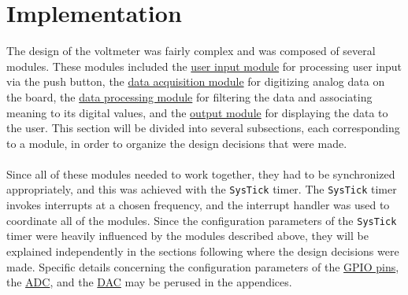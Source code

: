 \documentclass[12pt]{report}
\begin{document}
\section{Implementation}
The design of the voltmeter was fairly complex and was composed of several modules.
These modules included the \hyperref[userinput]{user input module} for processing user input via the
push button, the \hyperref[dataaq]{data
acquisition module} for digitizing analog data on the board, the \hyperref[dataproc]{data processing
module} for filtering
the data and associating meaning to its digital values, and the \hyperref[output]{output module} for
displaying the
data to the user. This section will be divided into several subsections, each corresponding to a
module, in order to organize the design decisions that were made.\\\\
Since all of these modules needed to work together, they had to be synchronized
appropriately, and this was achieved with the \texttt{SysTick} timer. The \texttt{SysTick} timer
invokes interrupts at a chosen frequency, and the interrupt handler was used to coordinate all of
the modules. Since the configuration parameters of the \texttt{SysTick} timer were heavily
influenced by the modules described above, they will be explained independently in the sections
following where the design decisions were made. Specific details concerning the configuration
parameters of the \hyperref[appendixgpio]{GPIO pins}, the \hyperref[appendixadc]{ADC}, and the
\hyperref[appendixdac]{DAC} may be perused in the appendices.
\end{document}
